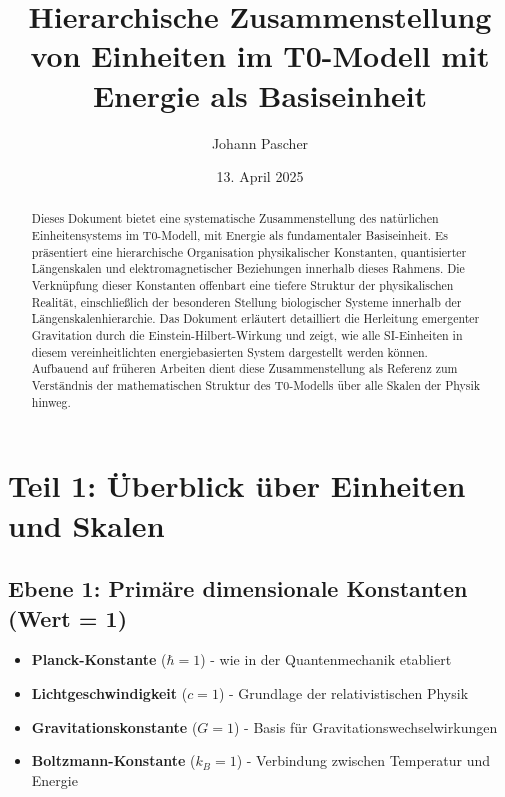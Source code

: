 \documentclass[12pt,a4paper]{article}
\begin{document}
	
	\title{Hierarchische Zusammenstellung von Einheiten im T0-Modell mit Energie als Basiseinheit}
	\author{Johann Pascher}
	\date{13. April 2025}
	\maketitle

\begin{abstract}
	Dieses Dokument bietet eine systematische Zusammenstellung des natürlichen Einheitensystems im T0-Modell, mit Energie als fundamentaler Basiseinheit. Es präsentiert eine hierarchische Organisation physikalischer Konstanten, quantisierter Längenskalen und elektromagnetischer Beziehungen innerhalb dieses Rahmens. Die Verknüpfung dieser Konstanten offenbart eine tiefere Struktur der physikalischen Realität, einschließlich der besonderen Stellung biologischer Systeme innerhalb der Längenskalenhierarchie. Das Dokument erläutert detailliert die Herleitung emergenter Gravitation durch die Einstein-Hilbert-Wirkung und zeigt, wie alle SI-Einheiten in diesem vereinheitlichten energiebasierten System dargestellt werden können. Aufbauend auf früheren Arbeiten \cite{pascher_planck_2025, pascher_alpha_2025, pascher_alphabeta_2025} dient diese Zusammenstellung als Referenz zum Verständnis der mathematischen Struktur des T0-Modells über alle Skalen der Physik hinweg.
\end{abstract}

\section*{Teil 1: Überblick über Einheiten und Skalen}

\subsection*{Ebene 1: Primäre dimensionale Konstanten (Wert = 1)}
\begin{itemize}[itemsep=0.5em]
	\item \textbf{Planck-Konstante} ($\hbar = 1$) - wie in der Quantenmechanik etabliert \cite{planck1901}
	\item \textbf{Lichtgeschwindigkeit} ($c = 1$) - Grundlage der relativistischen Physik \cite{einstein1905}
	\item \textbf{Gravitationskonstante} ($G = 1$) - Basis für Gravitationswechselwirkungen \cite{newton1687}
	\item \textbf{Boltzmann-Konstante} ($k_B = 1$) - Verbindung zwischen Temperatur und Energie \cite{boltzmann1872}
\end{itemize}
\end{document}

